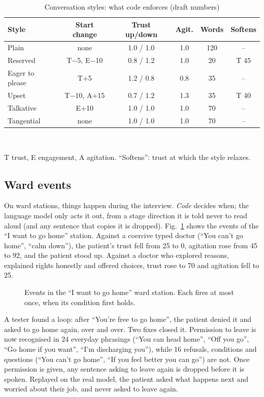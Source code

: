 \documentclass{article}
\begin{document}
\begin{table}[t]
\caption{Conversation styles: what code enforces (draft numbers)}
\label{tab:styles}
\centering
\scriptsize
\begin{tabular}{@{}lccccc@{}}
\toprule
Style & Start change & Trust up/down & Agit. & Words & Softens\\
\midrule
Plain & none & 1.0 / 1.0 & 1.0 & 120 & --\\
Reserved & T$-$5, E$-$10 & 0.8 / 1.2 & 1.0 & 20 & T 45\\
Eager to please & T+5 & 1.2 / 0.8 & 0.8 & 35 & --\\
Upset & T$-$10, A+15 & 0.7 / 1.2 & 1.3 & 35 & T 40\\
Talkative & E+10 & 1.0 / 1.0 & 1.0 & 70 & --\\
Tangential & none & 1.0 / 1.0 & 1.0 & 70 & --\\
\bottomrule
\end{tabular}
\\[1mm]\raggedright\scriptsize T trust, E engagement, A agitation. ``Softens'': trust at which the style relaxes.
\end{table}

\subsection{Ward events}
On ward stations, things happen during the interview. \emph{Code} decides when; the language model only acts it out, from a stage direction it is
told never to read aloud (and any sentence that copies it is dropped). Fig.~\ref{fig:events} shows the events of the ``I want to go home''
station. Against a coercive typed doctor (``You can't go home'', ``calm down''), the patient's trust fell from 25 to 0, agitation rose from 45 to 92, and the patient stood up. Against a doctor who explored reasons, explained rights honestly and offered choices, trust rose to 70 and agitation fell to 25.

\begin{figure}[t]
\caption{Events in the ``I want to go home'' ward station. Each fires at most once, when its condition first holds.}
\label{fig:events}
\end{figure}

A tester found a loop: after ``You're free to go home'', the patient denied it and asked to go home again, over and over. Two fixes closed it.
Permission to leave is now recognised in 24 everyday phrasings (``You can head home'', ``Off you go'', ``Go home if you want'', ``I'm discharging
you''), while 16 refusals, conditions and questions (``You can't go home'', ``If you feel better you can go'') are not. Once permission is given,
any sentence asking to leave again is dropped before it is spoken. Replayed on the real model, the patient asked what happens next and worried
about their job, and never asked to leave again.
\end{document}
